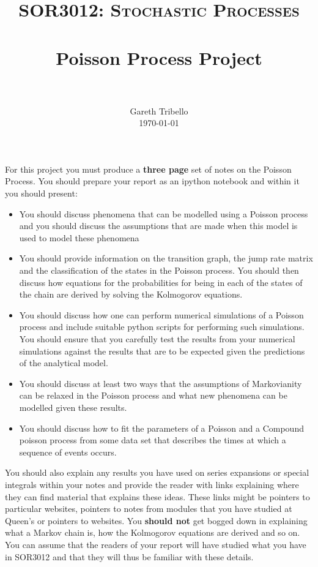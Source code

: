 \documentclass[paper=a4, fontsize=11pt]{scrartcl}
\title{\usefont{OT1}{bch}{b}{n} \normalfont \normalsize \textsc{SOR3012:
Stochastic Processes} \\ [25pt] \horrule{0.5pt} \\[0.4cm] 
\huge Poisson Process Project \\
\horrule{2pt} \\[0.25cm]
}
\author{ \normalfont
\normalsize
        Gareth Tribello \\[-3pt] \normalsize
        \today
}
\date{}
\numberwithin{equation}{section}
\numberwithin{figure}{section}
\numberwithin{table}{section}
\begin{document}
\maketitle

For this project you must produce a {\bf three page} set of notes on the Poisson Process.  You should prepare your report as an ipython notebook and within it you should present:

\begin{itemize}
 \item You should discuss phenomena that can be modelled using a Poisson process and you should discuss the assumptions that are made when this model is used to model these phenomena

 \item You should provide information on the transition graph, the jump rate matrix and the classification of the states in the Poisson process.  You should then discuss how equations for the probabilities for being in each of the states of the chain are derived by solving the Kolmogorov equations. 

 \item You should discuss how one can perform numerical simulations of a Poisson process and include suitable python scripts for performing such simulations.  You should ensure that you carefully test the results from your numerical simulations against the results that are to be expected given the predictions of the analytical model.

 \item You should discuss at least two ways that the assumptions of Markovianity can be relaxed in the Poisson process and what new phenomena can be modelled given these results.

 \item You should discuss how to fit the parameters of a Poisson and a Compound poisson process from some data set that describes the times at which a sequence of events occurs. 
\end{itemize}

You should also explain any results you have used on series expansions or special integrals within your notes and provide the reader with links explaining where they can find material that explains 
these ideas.  These links might be pointers to particular websites, pointers to notes from modules that you have studied at Queen's or pointers to websites.  You {\bf should not} get bogged down in 
explaining what a Markov chain is, how the Kolmogorov equations are derived and so on. You can assume that the readers of your report will have studied what you have in SOR3012 and that they will thus
be familiar with these details.
\end{document}
